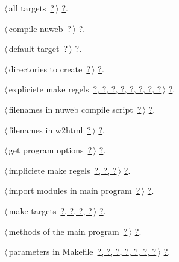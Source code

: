 \documentclass[twoside]{artikel3}
\renewcommand{\NWlink}[2]{\hyperlink{#1}{#2}}
\renewcommand{\NWlink}[2]{\hyperlink{#1}{#2}}
\begin{document}
{\small\begin{list}{}{\setlength{\itemsep}{-\parsep}\setlength{\itemindent}{-\leftmargin}}
\item $\langle\,$all targets\nobreak\ {\footnotesize \NWlink{nuweb?}{?}}$\,\rangle$ {\footnotesize {\NWtxtRefIn} \NWlink{nuweb?}{?}.}
\item $\langle\,$compile nuweb\nobreak\ {\footnotesize \NWlink{nuweb?}{?}}$\,\rangle$ {\footnotesize {\NWtxtRefIn} \NWlink{nuweb?}{?}.}
\item $\langle\,$default target\nobreak\ {\footnotesize \NWlink{nuweb?}{?}}$\,\rangle$ {\footnotesize {\NWtxtRefIn} \NWlink{nuweb?}{?}.}
\item $\langle\,$directories to create\nobreak\ {\footnotesize \NWlink{nuweb?}{?}}$\,\rangle$ {\footnotesize {\NWtxtRefIn} \NWlink{nuweb?}{?}.}
\item $\langle\,$expliciete make regels\nobreak\ {\footnotesize \NWlink{nuweb?}{?}\NWlink{nuweb?}{, ?}\NWlink{nuweb?}{, ?}\NWlink{nuweb?}{, ?}\NWlink{nuweb?}{, ?}\NWlink{nuweb?}{, ?}\NWlink{nuweb?}{, ?}\NWlink{nuweb?}{, ?}}$\,\rangle$ {\footnotesize {\NWtxtRefIn} \NWlink{nuweb?}{?}.}
\item $\langle\,$filenames in nuweb compile script\nobreak\ {\footnotesize \NWlink{nuweb?}{?}}$\,\rangle$ {\footnotesize {\NWtxtRefIn} \NWlink{nuweb?}{?}.}
\item $\langle\,$filenames in w2html\nobreak\ {\footnotesize \NWlink{nuweb?}{?}}$\,\rangle$ {\footnotesize {\NWtxtRefIn} \NWlink{nuweb?}{?}.}
\item $\langle\,$get program options\nobreak\ {\footnotesize \NWlink{nuweb?}{?}}$\,\rangle$ {\footnotesize {\NWtxtRefIn} \NWlink{nuweb?}{?}.}
\item $\langle\,$impliciete make regels\nobreak\ {\footnotesize \NWlink{nuweb?}{?}\NWlink{nuweb?}{, ?}\NWlink{nuweb?}{, ?}}$\,\rangle$ {\footnotesize {\NWtxtRefIn} \NWlink{nuweb?}{?}.}
\item $\langle\,$import modules in main program\nobreak\ {\footnotesize \NWlink{nuweb?}{?}}$\,\rangle$ {\footnotesize {\NWtxtRefIn} \NWlink{nuweb?}{?}.}
\item $\langle\,$make targets\nobreak\ {\footnotesize \NWlink{nuweb?}{?}\NWlink{nuweb?}{, ?}\NWlink{nuweb?}{, ?}\NWlink{nuweb?}{, ?}}$\,\rangle$ {\footnotesize {\NWtxtRefIn} \NWlink{nuweb?}{?}.}
\item $\langle\,$methods of the main program\nobreak\ {\footnotesize \NWlink{nuweb?}{?}}$\,\rangle$ {\footnotesize {\NWtxtRefIn} \NWlink{nuweb?}{?}.}
\item $\langle\,$parameters in Makefile\nobreak\ {\footnotesize \NWlink{nuweb?}{?}\NWlink{nuweb?}{, ?}\NWlink{nuweb?}{, ?}\NWlink{nuweb?}{, ?}\NWlink{nuweb?}{, ?}\NWlink{nuweb?}{, ?}\NWlink{nuweb?}{, ?}}$\,\rangle$ {\footnotesize {\NWtxtRefIn} \NWlink{nuweb?}{?}.}

\end{list}}
\end{document}
